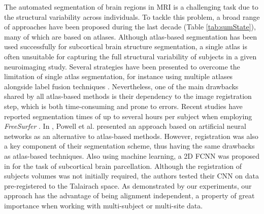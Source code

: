 \documentclass[twoside,fleqn,espcrc2]{elsarticle}
\newcommand{\FreeSurfer}{\textit{FreeSurfer}}
\begin{document}
The automated segmentation of brain regions in MRI is a challenging task due to the structural variability across individuals. To tackle this problem, a broad range of approaches have been proposed during the last decade (Table \ref{tab:sumState}), many of which are based on atlases. Although atlas-based segmentation has been used successfully for subcortical brain structure segmentation, a single atlas is often unsuitable for capturing the full structural variability of subjects in a given neuroimaging study. Several strategies have been presented to overcome the limitation of single atlas segmentation, for instance using multiple atlases alongside label fusion techniques \cite{khan2011optimal}. Nevertheless, one of the main drawbacks shared by all atlas-based methods is their dependency to the image registration step, which is both time-consuming and prone to errors. Recent studies have reported segmentation times of up to several hours per subject when employing \FreeSurfer{} \cite{khan2008freesurfer,huo2016consistent}. In \cite{powell2008registration}, Powell et al. presented an approach based on artificial neural networks as an alternative to atlas-based methods. However, registration was also a key component of their segmentation scheme, thus having the same drawbacks as atlas-based techniques. Also using machine learning, a 2D FCNN was proposed in \cite{shakeri2016sub} for the task of subcortical brain parcellation. Although the registration of subjects volumes was not initially required, the authors tested their CNN on data pre-registered to the Talairach space. As demonstrated by our experiments, our approach has the advantage of being alignment independent, a property of great importance when working with multi-subject or multi-site data. 
\end{document}
